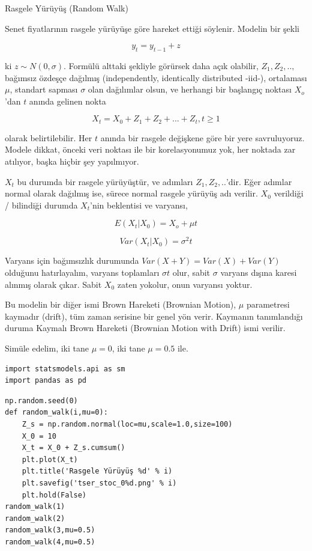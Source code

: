 \documentclass[12pt,fleqn]{article}\usepackage{../../common}
\begin{document}
Rasgele Yürüyüş (Random Walk)

Senet fiyatlarının rasgele yürüyüşe göre hareket ettiği söylenir. Modelin
bir şekli

$$ y_t = y_{t-1} + z $$

ki $z \sim N(0,\sigma)$. Formülü alttaki şekliyle görürsek daha açık olabilir,
$Z_1,Z_2,..,$ bağımsız özdeşçe dağılmış (independently, identically distributed
-iid-), ortalaması $\mu$, standart sapması $\sigma$ olan dağılımlar olsun, ve
herhangi bir başlangıç noktası $X_o$'dan $t$ anında gelinen nokta

$$ X_t = X_0 + Z_1 + Z_2 + ... + Z_t , t \ge 1$$

olarak belirtilebilir. Her $t$ anında bir rasgele değişkene göre bir yere
savruluyoruz. Modele dikkat, önceki veri noktası ile bir korelasyonumuz yok, her
noktada zar atılıyor, başka hiçbir şey yapılmıyor.

$X_t$ bu durumda bir rasgele yürüyüştür, ve adımları $Z_1,Z_2,..$'dir. Eğer
adımlar normal olarak dağılmış ise, sürece normal rasgele yürüyüş adı
verilir. $X_0$ verildiği / bilindiği durumda $X_t$'nin beklentisi ve varyansı,

$$ E(X_t|X_0) = X_o + \mu t $$

$$ Var(X_t|X_0) = \sigma^2 t $$

Varyans için bağımsızlık durumunda $Var(X+Y) = Var(X)+Var(Y)$ olduğunu
hatırlayalım, varyans toplamları $\sigma t$ olur, sabit $\sigma$ varyans dışına
karesi alınmış olarak çıkar. Sabit $X_0$ zaten yokolur, onun varyansı yoktur.

Bu modelin bir diğer ismi Brown Hareketi (Brownian Motion), $\mu$ parametresi
kaymadır (drift), tüm zaman serisine bir genel yön verir. Kaymanın tanımlandığı
duruma Kaymalı Brown Hareketi (Brownian Motion with Drift) ismi verilir.

Simüle edelim, iki tane $\mu=0$, iki tane $\mu=0.5$ ile. 

\begin{verbatim}
import statsmodels.api as sm
import pandas as pd
\end{verbatim}

\begin{verbatim}
np.random.seed(0)
def random_walk(i,mu=0):
    Z_s = np.random.normal(loc=mu,scale=1.0,size=100)
    X_0 = 10
    X_t = X_0 + Z_s.cumsum()
    plt.plot(X_t)
    plt.title('Rasgele Yürüyüş %d' % i)
    plt.savefig('tser_stoc_0%d.png' % i)
    plt.hold(False)
random_walk(1)
random_walk(2)
random_walk(3,mu=0.5)
random_walk(4,mu=0.5)
\end{verbatim}
\end{document}

